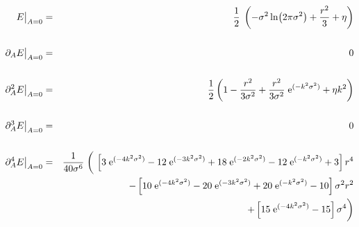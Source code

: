 \begin{small}
    \begin{eqnarray*}
        E\big\vert_{A=0}&=&\frac{1}{2}\;\left(-\sigma^2\ln\!\left(2\pi\sigma^2\right)+\frac{r^2}{3}+\eta\right)\\
        &&\\
        \partial_A E\big\vert_{A=0}&=&0\\
        &&\\
        \partial_A^2 E\big\vert_{A=0}&=&\frac{1}{2}\left(1-\frac{r^2}{3\sigma^2}+\frac{r^2}{3\sigma^2}\;{\rm e}^{(-k^2\sigma^2)}+\eta k^2\right)\\
        &&\\
        \partial_A^3 E\big\vert_{A=0}&=&0\\
        &&\\
        \partial_A^4 E\big\vert_{A=0}&=&\frac{1}{40\sigma^6}\;\bigg(\,\left[ 3\;{\rm e}^{(-4k^2\sigma^2)}-12\;{\rm e}^{(-3k^2\sigma^2)}+18\;{\rm e}^{(-2k^2\sigma^2)}-12\;{\rm e}^{(-k^2\sigma^2)}+3 \right] r^4\\
        &&\qquad\;\;\,-\left[ 10\;{\rm e}^{(-4k^2\sigma^2)}-20\;{\rm e}^{(-3k^2\sigma^2)}+20\;{\rm e}^{(-k^2\sigma^2)}-10 \right] \sigma^2 r^2\\
        &&\qquad\;\;\,+\left[ 15\;{\rm e}^{(-4k^2\sigma^2)}-15 \right] \sigma^4 \bigg)
    \end{eqnarray*}
\end{small}
